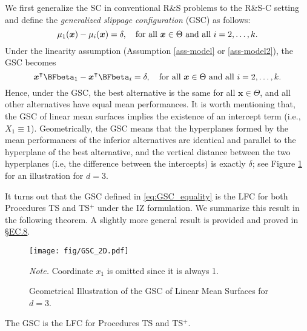 \documentclass[ijoc,nonblindrev]{informs3}
\def\bx{{\bm x}}
\begin{document}
We first generalize the SC in conventional R\&S problems to the R\&S-C setting and define the \textit{generalized slippage configuration} (GSC) as follows:
\begin{equation} \label{eq-GSC}
\mu_1(\bx) - \mu_i(\bx) = \delta,\quad \textnormal{for all}\ \bx\in\Theta\ \textnormal{and all}\ i=2,\ldots,k.
\end{equation}
Under the linearity assumption (Assumption \ref{ass-model} or \ref{ass-model2}), the GSC becomes
\begin{equation}\label{eq:GSC_equality}
 \bx^\intercal \BFbeta_1 - \bx^\intercal \BFbeta_i= \delta,  \quad \textnormal{for all}\ \bx\in\Theta\ \textnormal{and all}\ i=2,\ldots,k.
\end{equation}
Hence, under the GSC, the best alternative is the same for all $\bx\in\Theta$, and all other alternatives have equal mean performances.
It is worth mentioning that, the GSC of linear mean surfaces implies the existence of an intercept term (i.e., $X_1 \equiv 1$).
Geometrically, the GSC means that the hyperplanes formed by the mean performances of the inferior alternatives are identical and parallel to the hyperplane of the best alternative,
and the vertical distance between the two hyperplanes (i.e, the difference between the intercepts) is exactly $\delta$; see Figure \ref{fig-GSC} for an illustration for $d=3$.

It turns out that the GSC defined in \eqref{eq:GSC_equality} is the LFC for both Procedures TS and TS$^+$ under the IZ formulation.
We summarize this result in the following theorem.
A slightly more general result is provided and proved in \S\hyperlink{EC.8}{EC.8}.

\begin{figure}
\begin{center}
\texttt{[image: fig/GSC\_2D.pdf]}
\caption{Geometrical Illustration of the GSC of Linear Mean Surfaces for $d=3$.} \label{fig-GSC}
\end{center}
\begin{minipage}[t]{1\linewidth}
\vspace{-1.2em}
\SingleSpacedXI
\footnotesize{
\emph{Note.} \textsf{Coordinate $x_1$ is omitted since it is always 1.}
}
\end{minipage}
\end{figure}


\begin{theorem} \label{thm-GSC}
The GSC is the LFC for Procedures TS and TS$^+$.
\end{theorem}
\end{document}
